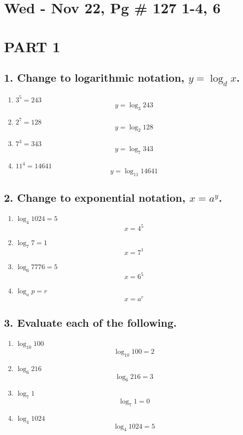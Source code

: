 \documentclass{article}
\begin{document}
\section*{Wed - Nov 22, Pg \# 127 1-4, 6}
\section*{PART 1}

\subsection*{1. Change to logarithmic notation, $y=\log _d x$.}

\begin{enumerate}
    \item $3^5=243$
    \[y = \log_3 243\]

    \item $2^7=128$
    \[y = \log_2 128\]

    \item $7^3=343$
    \[y = \log_7 343\]

    \item $11^4=14641$
    \[y = \log_{11} 14641\]
\end{enumerate}

\subsection*{2. Change to exponential notation, $x=a^y$.}

\begin{enumerate}
    \item $\log_4 1024=5$
    \[x = 4^5\]

    \item $\log_7 7=1$
    \[x = 7^1\]

    \item $\log_6 7776=5$
    \[x = 6^5\]

    \item $\log_a p=r$
    \[x = a^r\]
\end{enumerate}

\subsection*{3. Evaluate each of the following.}

\begin{enumerate}
    \item $\log_{10} 100$
    \[\log_{10} 100 = 2\]

    \item $\log_6 216$
    \[\log_6 216 = 3\]

    \item $\log_7 1$
    \[\log_7 1 = 0\]

    \item $\log_4 1024$
    \[\log_4 1024 = 5\]
\end{enumerate}
\end{document}

